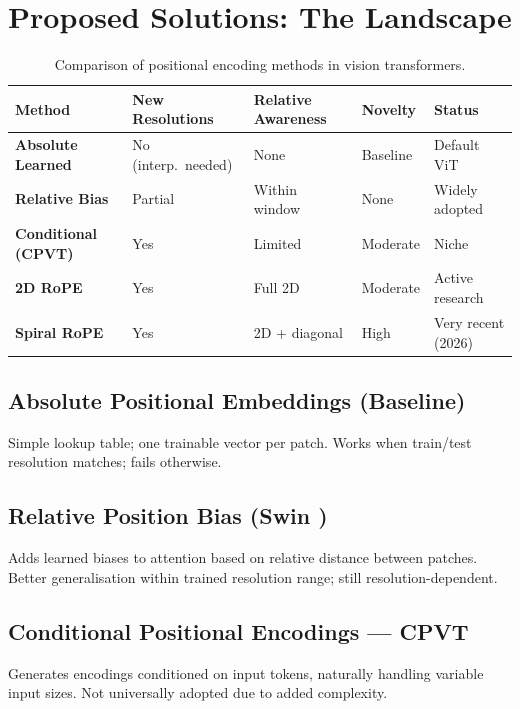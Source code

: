 \documentclass[12pt,a4paper]{article}
\begin{document}
\section{Proposed Solutions: The Landscape}
\label{sec:solutions}

\begin{table}[H]
\centering
\caption{Comparison of positional encoding methods in vision transformers.}
\label{tab:comparison}
\renewcommand{\arraystretch}{1.3}
\begin{tabularx}{\linewidth}{>{\bfseries}l X X X l}
\toprule
Method & New Resolutions & Relative Awareness & Novelty & Status \\
\midrule
Absolute Learned   & No (interp.\ needed) & None          & Baseline & Default ViT \\
Relative Bias      & Partial              & Within window  & None     & Widely adopted \\
Conditional (CPVT) & Yes                  & Limited        & Moderate & Niche \\
2D RoPE            & Yes                  & Full 2D        & Moderate & Active research \\
Spiral RoPE        & Yes                  & 2D + diagonal  & High     & Very recent (2026) \\
\bottomrule
\end{tabularx}
\end{table}

\subsection{Absolute Positional Embeddings (Baseline)}
Simple lookup table; one trainable vector per patch. Works when train/test
resolution matches; fails otherwise.

\subsection{Relative Position Bias (Swin \cite{swin2021})}
Adds learned biases to attention based on relative distance between patches.
Better generalisation within trained resolution range; still
resolution-dependent.

\subsection{Conditional Positional Encodings --- CPVT \cite{cpvt2021}}
Generates encodings conditioned on input tokens, naturally handling variable
input sizes. Not universally adopted due to added complexity.
\end{document}

